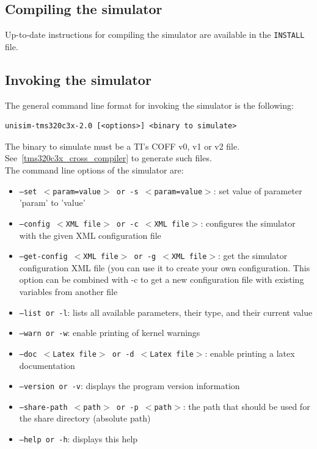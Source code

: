 \subsection{Compiling the simulator}

Up-to-date instructions for compiling the simulator are available in the \texttt{INSTALL} file.

\subsection{Invoking the simulator}

The general command line format for invoking the simulator is the following:

\begin{verbatim}
unisim-tms320c3x-2.0 [<options>] <binary to simulate>
\end{verbatim}

\noindent The binary to simulate must be a TI's COFF v0, v1 or v2 file. See~\ref{tms320c3x_cross_compiler} to generate such files.
\newline\\
\noindent The command line options of the simulator are:

\begin{itemize}
\item \texttt{--set $<$param=value$>$ or -s $<$param=value$>$}: set value of parameter 'param' to 'value'
\item \texttt{--config $<$XML file$>$ or -c $<$XML file$>$}: configures the simulator with the given XML configuration file
\item \texttt{--get-config $<$XML file$>$ or -g $<$XML file$>$}: get the simulator configuration XML file (you can use it to create your own configuration. This option can be combined with -c to get a new configuration file with existing variables from another file
\item \texttt{--list or -l}: lists all available parameters, their type, and their current value
\item \texttt{--warn or -w}: enable printing of kernel warnings
\item \texttt{--doc $<$Latex file$>$ or -d $<$Latex file$>$}: enable printing a latex documentation
\item \texttt{--version or -v}: displays the program version information
\item \texttt{--share-path $<$path$>$ or -p $<$path$>$}: the path that should be used for the share directory (absolute path)
\item \texttt{--help or -h}: displays this help
\end{itemize}

